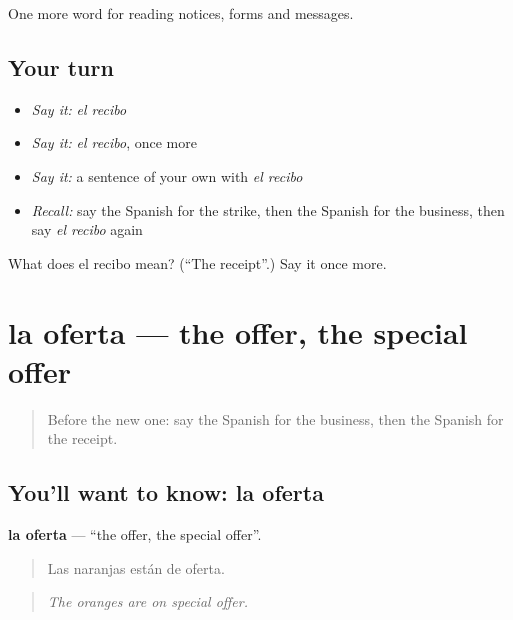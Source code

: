 \begin{grammarlens}[title={What you've built}]
One more word for reading notices, forms and messages.
\end{grammarlens}

\subsection*{Your turn}
\begin{itemize}
\raggedright
  \item \emph{Say it:} \emph{el recibo}
  \item \emph{Say it:} \emph{el recibo}, once more
  \item \emph{Say it:} a sentence of your own with \emph{el recibo}
  \item \emph{Recall:} say the Spanish for the strike, then the Spanish for the business, then say \emph{el recibo} again
\end{itemize}

\begin{tcolorbox}[breakable,colback=teal!4,colframe=teal!35!black,title={Before you move on}]
What does el recibo mean? (\textquotedblleft{}The receipt\textquotedblright{}.) Say it once more.
\end{tcolorbox}
\section[la oferta]{la oferta — the offer, the special offer}

\label{lesson:ES-C491-oferta}



\begin{quote}
Before the new one: say the Spanish for the business, then the Spanish for the receipt.
\end{quote}

\subsection*{You'll want to know: la oferta}
\textbf{la oferta} — \textquotedblleft{}the offer, the special offer\textquotedblright{}.

\begin{quote}
Las naranjas están de oferta.
\end{quote}

\begin{quote}
\emph{The oranges are on special offer.}
\end{quote}

